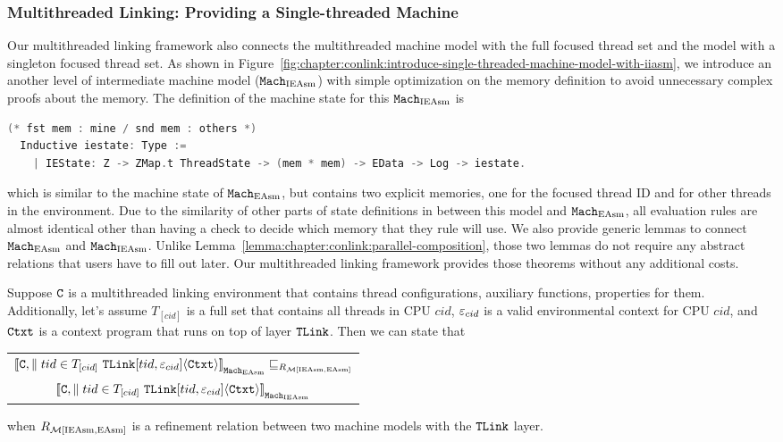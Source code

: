 \subsubsection{Multithreaded Linking: Providing a Single-threaded Machine}

Our multithreaded linking framework also connects the multithreaded machine model with the full focused thread set 
and the model with a singleton focused thread set. 
As shown in Figure~\ref{fig:chapter:conlink:introduce-single-threaded-machine-model-with-iiasm},
we introduce an another level of intermediate machine model (${\mathrm{\texttt{Mach}}}_{\mathrm{IEAsm}}$) with
simple optimization on the memory definition to avoid unnecessary complex proofs about the memory. 
The definition of the machine state for this ${\mathrm{\texttt{Mach}}}_{\mathrm{IEAsm}}$ is 
\begin{lstlisting}[language=C]
  (* fst mem : mine / snd mem : others *)
  Inductive iestate: Type :=
    | IEState: Z -> ZMap.t ThreadState -> (mem * mem) -> EData -> Log -> iestate.
\end{lstlisting}
which is similar to the machine state of ${\mathrm{\texttt{Mach}}}_{\mathrm{EAsm}}$, but 
contains two explicit memories, one for the focused thread ID and 
 for other threads in the environment.
Due to the similarity of other parts of state definitions in between this model and ${\mathrm{\texttt{Mach}}}_{\mathrm{EAsm}}$, 
all evaluation rules are almost identical other than having a check to decide which memory that they rule will use. 
We also provide generic lemmas to connect ${\mathrm{\texttt{Mach}}}_{\mathrm{EAsm}}$ and ${\mathrm{\texttt{Mach}}}_{\mathrm{IEAsm}}$. 
Unlike Lemma~\ref{lemma:chapter:conlink:parallel-composition},
those two lemmas
do not require any abstract relations that
users have to fill out later. 
Our multithreaded linking framework provides those theorems without any additional costs. 

\begin{lemma}
\label{lemma:chapter:conlink:easm-refines-iieasm}
Suppose  ${{\mathrm{\texttt{C}}}}$ is a multithreaded linking environment that contains thread configurations, auxiliary functions, properties for them. 
Additionally, let's assume   $T_{[cid]}$ is a full set that contains all threads in CPU $cid$, 
 ${\varepsilon}_{cid}$ is a valid
environmental context for CPU $cid$,
and ${\mathrm{\texttt{Ctxt}}}$ is a
context program that runs on top of layer ${{\mathrm{\texttt{TLink}}}}$.
 Then we can state that
 \begin{center}
\begin{tabular}{c}
${[\![{{{\mathrm{\texttt{C}}}}, \parallel tid \in T_{[cid]} \  {{\mathrm{\texttt{TLink}}}}[tid, {\varepsilon}_{cid}]} \langle {{\mathrm{\texttt{Ctxt}}}} \rangle]\!]}_{{\mathrm{\texttt{Mach}}}_{\mathrm{EAsm}}} \sqsubseteq_{R_{\mathcal{M}{[\mathrm{IEAsm}, \mathrm{EAsm}]}}}$\\ 
${[\![{{{\mathrm{\texttt{C}}}}, \parallel tid \in T_{[cid]} \  {{\mathrm{\texttt{TLink}}}}[tid, {\varepsilon}_{cid}]} \langle {{\mathrm{\texttt{Ctxt}}}} \rangle]\!]}_{{\mathrm{\texttt{Mach}}}_{\mathrm{IEAsm}}}$\\
\end{tabular}
\end{center}
when $R_{\mathcal{M}{[\mathrm{IEAsm}, \mathrm{EAsm}]}}$ is a refinement relation between two machine models with the ${{\mathrm{\texttt{TLink}}}}$ layer.
\end{lemma}


